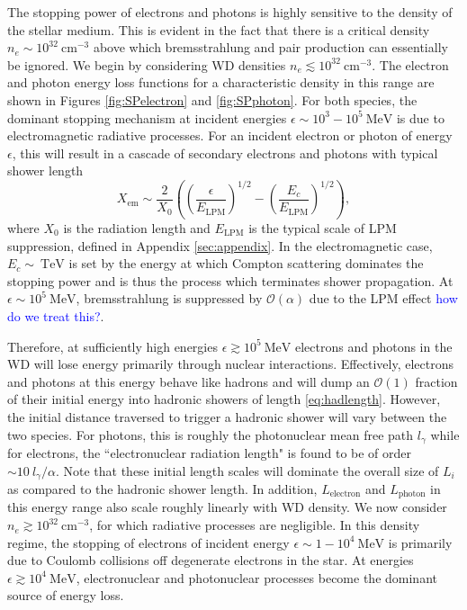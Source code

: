 \documentclass[twocolumn,showpacs,preprintnumbers,amsmath,amssymb,prd]{revtex4}
\newcommand{\OO}{\mathcal{O}}
\def\r{\right)}
\def\l{\left(}
\begin{document}
The stopping power of electrons and photons is highly sensitive to the density of the stellar medium. This is evident in the fact that there is a critical density $n_e \sim 10^{32} ~\text{cm}^{-3}$ above which bremsstrahlung and pair production can essentially be ignored. We begin by considering WD densities $n_e \lesssim 10^{32} ~\text{cm}^{-3}$. The electron and photon energy loss functions for a characteristic density in this range are shown in Figures \ref{fig:SPelectron} and \ref{fig:SPphoton}. For both species, the dominant stopping mechanism at incident energies $\epsilon \sim 10^{3}-10^{5} ~\text{MeV}$ is due to electromagnetic radiative processes. For an incident electron or photon of energy $\epsilon$, this will result in a cascade of secondary electrons and photons with typical shower length
\begin{equation}
X_\text{em} \sim \frac{2}{X_0} \l \l \frac{\epsilon}{E_\text{LPM}}\r^{1/2} - \l \frac{E_c}{E_\text{LPM}}\r^{1/2} \r,
\end{equation}
where $X_0$ is the radiation length and $E_\text{LPM}$ is the typical scale of LPM suppression, defined in Appendix \ref{sec:appendix}. In the electromagnetic case, $E_c \sim ~\text{TeV}$ is set by the energy at which Compton scattering dominates the stopping power and is thus the process which terminates shower propagation. At $\epsilon \sim 10^{5} ~\text{MeV}$, bremsstrahlung is suppressed by $\OO(\alpha)$ due to the LPM effect \textcolor{blue}{how do we treat this?}.

Therefore, at sufficiently high energies $\epsilon \gtrsim 10^5 ~\text{MeV}$ electrons and photons in the WD will lose energy primarily through nuclear interactions. Effectively, electrons and photons at this energy behave like hadrons and will dump an $\OO(1)$ fraction of their initial energy into hadronic showers of length \eqref{eq:hadlength}. However, the initial distance traversed to trigger a hadronic shower will vary between the two species. For photons, this is roughly the photonuclear mean free path $l_\gamma$ while for electrons, the ``electronuclear radiation length" is found to be of order $\sim 10  ~l_\gamma/\alpha$. Note that these initial length scales will dominate the overall size of $L_i$ as compared to the hadronic shower length. In addition, $L_\text{electron}$ and $L_\text{photon}$ in this energy range also scale roughly linearly with WD density. We now consider $n_e \gtrsim 10^{32} ~\text{cm}^{-3}$, for which radiative processes are negligible. In this density regime, the stopping of electrons of incident energy $\epsilon \sim 1 - 10^4 ~\text{MeV}$ is primarily due to Coulomb collisions off degenerate electrons in the star. At energies $\epsilon \gtrsim 10^4 ~\text{MeV}$, electronuclear and photonuclear processes become the dominant source of energy loss.
\end{document}
